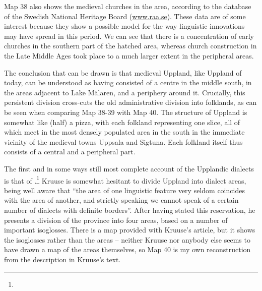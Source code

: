 \begin{styleBodytextC}
Map 38 also shows the medieval churches in the area, according to the database of the Swedish National Heritage Board (\href{http://www.raa.se/}{www.raa.se}). These data are of some interest because they show a possible model for the way linguistic innovations may have spread in this period. We can see that there is a concentration of early churches in the southern part of the hatched area, whereas church construction in the Late Middle Ages took place to a much larger extent in the peripheral areas.

\end{styleBodytextC}

\begin{styleBodytextC}
The conclusion that can be drawn is that medieval Uppland, like Uppland of today, can be understood as having consisted of a centre in the middle south, in the areas adjacent to Lake Mälaren, and a periphery around it. Crucially, this persistent division cross-cuts the old administrative division into folklands, as can be seen when comparing Map 38-39 with Map 40. The structure of Uppland is somewhat like (half) a pizza, with each folkland representing one slice, all of which meet in the most densely populated area in the south in the immediate vicinity of the medieval towns Uppsala and Sigtuna. Each folkland itself thus consists of a central and a peripheral part. 

\end{styleBodytextC}

\begin{styleBodytextC}
 The first and in some ways still most complete account of the Upplandic dialects is that of \citet{Kruuse1908}.\footnote{} Kruuse is somewhat hesitant to divide Uppland into dialect areas, being well aware that “the area of one linguistic feature very seldom coincides with the area of another, and strictly speaking we cannot speak of a certain number of dialects with definite borders”. After having stated this reservation, he presents a division of the province into four areas, based on a number of important isoglosses. There is a map provided with Kruuse’s article, but it shows the isoglosses rather than the areas – neither Kruuse nor anybody else seems to have drawn a map of the areas themselves, so Map 40 is my own reconstruction from the description in Kruuse’s text. 

\end{styleBodytextC}

